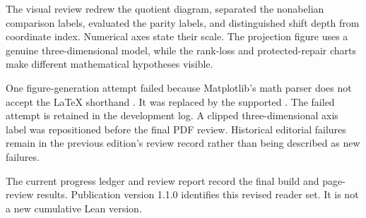 \documentclass[11pt]{article}
\begin{document}
The visual review redrew the quotient diagram, separated the nonabelian comparison labels, evaluated the parity labels, and distinguished shift depth from coordinate index. Numerical axes state their scale. The projection figure uses a genuine three-dimensional model, while the rank-loss and protected-repair charts make different mathematical hypotheses visible.

One figure-generation attempt failed because Matplotlib's math parser does not accept the LaTeX shorthand \code{\ge}. It was replaced by the supported \code{\geq}. The failed attempt is retained in the development log. A clipped three-dimensional axis label was repositioned before the final PDF review. Historical editorial failures remain in the previous edition's review record rather than being described as new failures.

The current progress ledger and review report record the final build and page-review results. Publication version 1.1.0 identifies this revised reader set. It is not a new cumulative Lean version.
\end{document}
